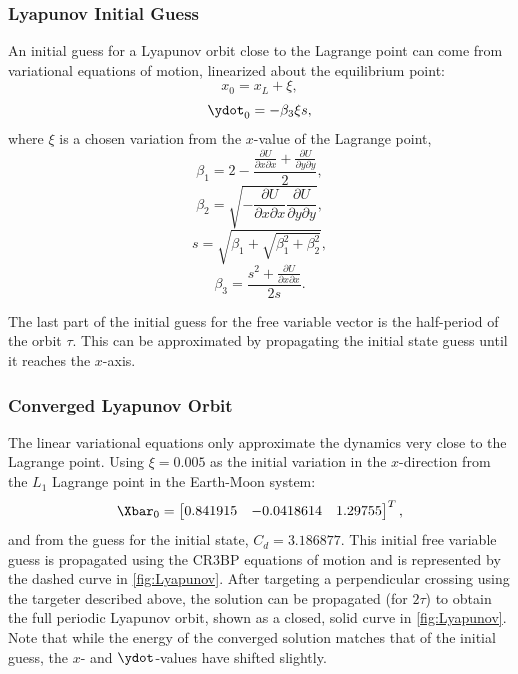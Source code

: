 \subsubsection{Lyapunov Initial Guess}
An initial guess for a Lyapunov orbit close to the Lagrange point can come from variational
equations of motion, linearized about the equilibrium point:
\begin{equation}
    x_{0}=x_{L}+\xi,
    \label{eq:xvar}
\end{equation}
\begin{equation}
    \ydot_{0}=-\beta_{3}\xi s,
    \label{eq:ydotvar}
\end{equation}
where $\xi$ is a chosen variation from the $x$-value of the Lagrange point,
\begin{equation}
    \beta_{1}=2-\frac{\frac{\partial U}{\partial x\partial x}+\frac{\partial U}{\partial y\partial y}}{2},
    \label{eq:beta1}
\end{equation}
\begin{equation}
    \beta_{2}=\sqrt{-\frac{\partial U}{\partial x\partial x}\frac{\partial U}{\partial y\partial y}},
    \label{eq:beta2}
\end{equation}
\begin{equation}
    s=\sqrt{\beta_{1}+\sqrt{\beta_{1}^{2}+\beta_{2}^{2}}},
    \label{eq:s}
\end{equation}
\begin{equation}
    \beta_{3}=\frac{s^{2}+\frac{\partial U}{\partial x\partial x}}{2s}.
    \label{eq:beta3}
\end{equation}

The last part of the initial guess for the free variable vector is the half-period of the orbit
$\tau$. This can be approximated by propagating the initial state guess until it reaches the
$x$-axis.

\subsubsection{Converged Lyapunov Orbit}
The linear variational equations only approximate the dynamics very close to the Lagrange point.
Using $\xi=0.005$ as the initial variation in the $x$-direction from the $L_{1}$ Lagrange point in
the Earth-Moon system:
\begin{equation}
    \Xbar_{0}=\begin{bmatrix}   0.841915    &   -0.0418614  &   1.29755\end{bmatrix}^{T},
    \label{eq:Lyapunovguess}
\end{equation}
and from the guess for the initial state, $C_{d}=3.186877$. This initial free variable guess is
propagated using the CR3BP equations of motion and is represented by the dashed curve in
\cref{fig:Lyapunov}. After targeting a perpendicular crossing using the targeter described above,
the solution can be propagated (for $2\tau$) to obtain the full periodic Lyapunov orbit, shown as
a closed, solid curve in \cref{fig:Lyapunov}. Note that while the energy of the converged solution
matches that of the initial guess, the $x$- and $\ydot$-values have shifted slightly.

